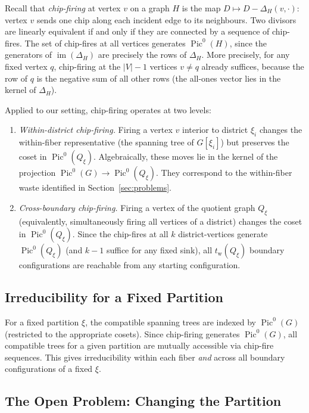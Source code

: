 \documentclass[11pt]{article}
\newcommand{\Pic}{\operatorname{Pic}^0}
\newcommand{\im}{\operatorname{im}}
\newcommand{\tw}{t_{\mathrm{w}}}
\begin{document}
Recall that \emph{chip-firing} at vertex $v$ on a graph $H$ is the map
$D \mapsto D - \Delta_H(v, \cdot)$: vertex $v$ sends one chip along each
incident edge to its neighbours. Two divisors are linearly equivalent if and
only if they are connected by a sequence of chip-fires. The set of chip-fires
at all vertices generates $\Pic(H)$, since the generators of
$\im(\Delta_H)$ are precisely the rows of $\Delta_H$. More precisely, for any
fixed vertex $q$, chip-firing at the $|V|-1$ vertices $v \neq q$ already
suffices, because the row of $q$ is the negative sum of all other rows (the
all-ones vector lies in the kernel of $\Delta_H$).

Applied to our setting, chip-firing operates at two levels:

\begin{enumerate}
  \item \emph{Within-district chip-firing.} Firing a vertex $v$ interior to
    district $\xi_i$ changes the within-fiber representative (the spanning tree
    of $G[\xi_i]$) but preserves the coset in $\Pic(Q_{\xi})$. Algebraically,
    these moves lie in the kernel of the projection
    $\Pic(G) \to \Pic(Q_{\xi})$. They correspond to the within-fiber waste
    identified in Section~\ref{sec:problems}.

  \item \emph{Cross-boundary chip-firing.} Firing a vertex of the quotient
    graph $Q_{\xi}$ (equivalently, simultaneously firing all vertices of a
    district) changes the coset in $\Pic(Q_{\xi})$. Since the chip-fires at
    all $k$ district-vertices generate $\Pic(Q_{\xi})$ (and $k-1$ suffice for
    any fixed sink), all $\tw(Q_{\xi})$ boundary configurations are reachable
    from any starting configuration.
\end{enumerate}

\subsection{Irreducibility for a Fixed Partition}

For a fixed partition $\xi$, the compatible spanning trees are indexed by
$\Pic(G)$ (restricted to the appropriate cosets). Since chip-firing generates
$\Pic(G)$, all compatible trees for a given partition are mutually accessible
via chip-fire sequences. This gives irreducibility within each fiber
\emph{and} across all boundary configurations of a fixed $\xi$.

\subsection{The Open Problem: Changing the Partition}
\end{document}
